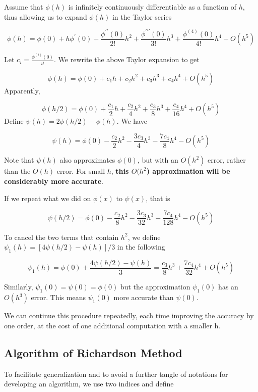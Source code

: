 \documentclass[
]{book}
\begin{document}
Assume that \(\phi(h)\) is infinitely continuously differentiable as a function of \(h\), thus allowing us to expand \(\phi(h)\) in the Taylor series

\[
\phi(h) = \phi(0) + h\phi^\prime(0) + \frac{\phi^{\prime\prime}(0)}{2!}h^2 + \frac{\phi^{\prime\prime\prime}(0)}{3!}h^3 + \frac{\phi^{(4)}(0)}{4!}h^4 + O(h^5)
\]

Let \(c_i = \frac{\phi^{(i)}(0)}{i!}\). We rewrite the above Taylor expansion to get

\[
\phi(h) = \phi(0) + c_1h + c_2h^2 + c_3h^3 + c_4h^4 + O(h^5)
\]
Apparently,

\[
\phi(h/2) = \phi(0) + \frac{c_1}{2}h + \frac{c_2}{4}h^2 + \frac{c_3}{8}h^3 + \frac{c_4}{16}h^4 + O(h^5)
\]
Define \(\psi(h) = 2\phi(h/2) - \phi(h)\). We have

\[
\psi(h) = \phi(0) - \frac{c_2}{2}h^2 - \frac{3c_3}{4}h^3 - \frac{7c_4}{8}h^4 - O(h^5)
\]

Note that \(\psi(h)\) also approximates \(\phi(0)\), but with an \(O(h^2)\) error, rather than the \(O(h)\) error. For small \(h\), \textbf{this \(O(h^2\)) approximation will be considerably more accurate}.

If we repeat what we did on \(\phi(x)\) to \(\psi(x)\), that is

\[
\psi(h/2) = \phi(0) -\frac{c_2}{8}h^2 - \frac{3c_3}{32}h^3 -\frac{7c_4}{128}h^4 - O(h^5)
\]

To cancel the two terms that contain \(h^2\), we define \(\psi_1(h) = [4\psi(h/2) - \psi(h)]/3\) in the following

\[
\psi_1(h) = \phi(0)+\frac{4\psi(h/2) - \psi(h)}{3} = \frac{c_3}{8}h^3  + \frac{7c_4}{32}h^4 + O(h^5) 
\]

Similarly, \(\psi_1(0) = \psi(0) = \phi(0)\) but the approximation \(\psi_1(0)\) has an \(O(h^3)\) error. This means \(\psi_1(0)\) more accurate than \(\psi(0)\).

We can continue this procedure repeatedly, each time improving the accuracy by one order, at the cost of one additional computation with a smaller h.

\hfill\break

\hypertarget{algorithm-of-richardson-method}{%
\subsection{Algorithm of Richardson Method}\label{algorithm-of-richardson-method}}

To facilitate generalization and to avoid a further tangle of notations for developing an algorithm, we use two indices and define
\end{document}

